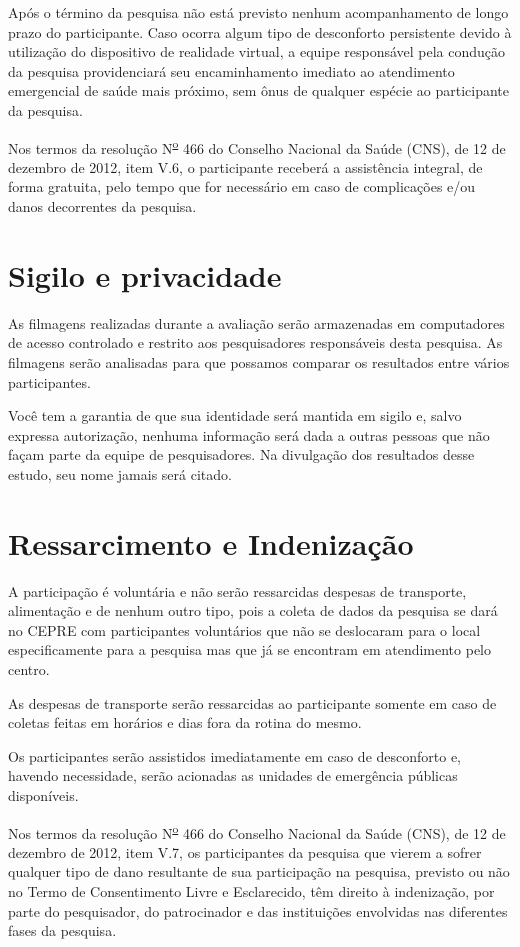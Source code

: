 \documentclass[a4paper,11pt,titlepage,singlespacing]{article}
\begin{document}
Após o término da pesquisa não está previsto nenhum acompanhamento de longo prazo do participante. Caso ocorra algum tipo de desconforto persistente devido à utilização do dispositivo de realidade virtual, a equipe responsável pela condução da pesquisa providenciará seu encaminhamento imediato ao atendimento emergencial de saúde mais próximo, sem ônus de qualquer espécie ao participante da pesquisa.

Nos termos da resolução N\textsuperscript{\underline{o}} 466 do Conselho Nacional da Saúde (CNS), de 12 de dezembro de 2012, item V.6, o participante receberá a assistência integral, de forma gratuita, pelo tempo que for necessário em caso de complicações e/ou danos decorrentes da pesquisa.


\section*{Sigilo e privacidade}

As filmagens realizadas durante a avaliação serão armazenadas em computadores de acesso controlado e restrito aos pesquisadores responsáveis desta pesquisa. As filmagens serão analisadas para que possamos comparar os resultados entre vários participantes.

Você tem a garantia de que sua identidade será mantida em sigilo e, salvo expressa autorização, nenhuma informação será dada a outras pessoas que não façam parte da equipe de pesquisadores. Na divulgação dos resultados desse estudo, seu nome jamais será citado.


\section*{Ressarcimento e Indenização}

A participação é voluntária e não serão ressarcidas despesas de transporte, alimentação e de nenhum outro tipo, pois a coleta de dados da pesquisa se dará no CEPRE com participantes voluntários que não se deslocaram para o local especificamente para a pesquisa mas que já se encontram em atendimento pelo centro.

As despesas de transporte serão ressarcidas ao participante somente em caso de coletas feitas em horários e dias fora da rotina do mesmo.

Os participantes serão assistidos imediatamente em caso de desconforto e, havendo necessidade, serão acionadas as unidades de emergência públicas disponíveis. 

Nos termos da resolução N\textsuperscript{\underline{o}} 466 do Conselho Nacional da Saúde (CNS), de 12 de dezembro de 2012, item V.7, os participantes da pesquisa que vierem a sofrer qualquer tipo de dano resultante de sua participação na pesquisa, previsto ou não no Termo de Consentimento Livre e Esclarecido, têm direito à indenização, por parte do pesquisador, do patrocinador e das instituições envolvidas nas diferentes fases da pesquisa.
\end{document}
